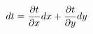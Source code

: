 \documentclass[preview]{standalone}
\begin{document}
\begin{align*}
\special{dvisvgm:raw <g id='unique000'>}dt = \frac{\partial t}{\partial x} dx + \frac{\partial t}{\partial y} dy\special{dvisvgm:raw </g>}
\end{align*}
\end{document}
